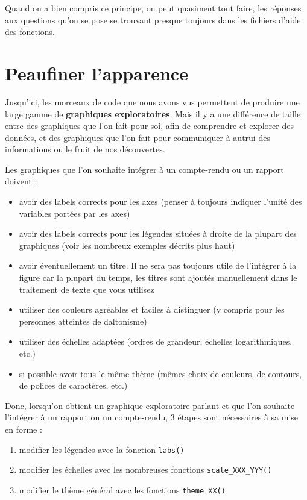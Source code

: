 \documentclass[
  a4paper,
  DIV=11,
  numbers=noendperiod,
  oneside]{scrreprt}
\providecommand{\tightlist}{%
  \setlength{\itemsep}{0pt}\setlength{\parskip}{0pt}}\usepackage{longtable,booktabs,array}
\begin{document}
Quand on a bien compris ce principe, on peut quasiment tout faire, les
réponses aux questions qu'on se pose se trouvant presque toujours dans
les fichiers d'aide des fonctions.

\section{Peaufiner l'apparence}\label{peaufiner-lapparence}

Jusqu'ici, les morceaux de code que nous avons vus permettent de
produire une large gamme de \textbf{graphiques exploratoires}. Mais il y
a une différence de taille entre des graphiques que l'on fait pour soi,
afin de comprendre et explorer des données, et des graphiques que l'on
fait pour communiquer à autrui des informations ou le fruit de nos
découvertes.

Les graphiques que l'on souhaite intégrer à un compte-rendu ou un
rapport doivent :

\begin{itemize}
\tightlist
\item
  avoir des labels corrects pour les axes (penser à toujours indiquer
  l'unité des variables portées par les axes)
\item
  avoir des labels corrects pour les légendes situées à droite de la
  plupart des graphiques (voir les nombreux exemples décrits plus haut)
\item
  avoir éventuellement un titre. Il ne sera pas toujours utile de
  l'intégrer à la figure car la plupart du temps, les titres sont
  ajoutés manuellement dans le traitement de texte que vous utilisez
\item
  utiliser des couleurs agréables et faciles à distinguer (y compris
  pour les personnes atteintes de daltonisme)
\item
  utiliser des échelles adaptées (ordres de grandeur, échelles
  logarithmiques, etc.)
\item
  si possible avoir tous le même thème (mêmes choix de couleurs, de
  contours, de polices de caractères, etc.)
\end{itemize}

Donc, lorsqu'on obtient un graphique exploratoire parlant et que l'on
souhaite l'intégrer à un rapport ou un compte-rendu, 3 étapes sont
nécessaires à sa mise en forme :

\begin{enumerate}
\def\labelenumi{\arabic{enumi}.}
\tightlist
\item
  modifier les légendes avec la fonction \texttt{labs()}
\item
  modifier les échelles avec les nombreuses fonctions
  \texttt{scale\_XXX\_YYY()}
\item
  modifier le thème général avec les fonctions \texttt{theme\_XX()}
\end{enumerate}
\end{document}
